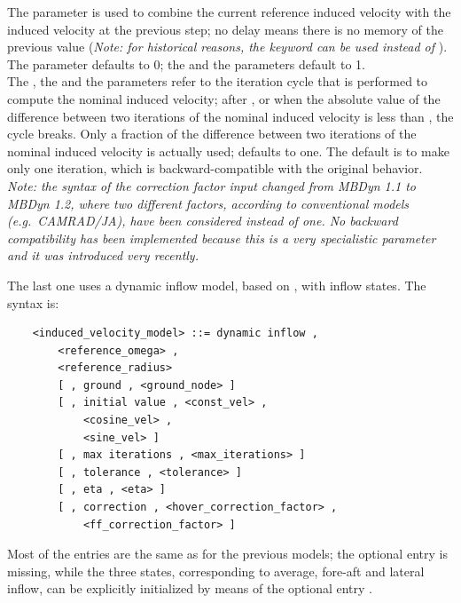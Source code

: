 The  parameter is used to
combine the current reference induced velocity with the induced velocity
at the previous step; no delay means there is no memory of the previous value 
(\emph{Note: for historical reasons, the keyword 
can be used instead of }). \\
The  parameter defaults to 0; 
the  
and the  parameters default to 1. \\
The , the  
and the  parameters refer to the iteration cycle 
that is performed to compute the nominal induced velocity; 
after , or when the absolute value 
of the difference between two iterations of the nominal induced 
velocity is less than , the cycle breaks.
Only a fraction  of the difference between two
iterations of the nominal induced velocity is actually
used;  defaults to one.
The default is to make only one iteration, which is backward-compatible
with the original behavior.
\emph{
	Note: the syntax of the correction factor input changed
	from MBDyn 1.1 to MBDyn 1.2, where two different factors,
	according to conventional models (e.g.\ CAMRAD/JA), have
	been considered instead of one.
	No backward compatibility has been implemented because 
	this is a very specialistic parameter and it was introduced 
	very recently.
}

\noindent
The last one uses a dynamic inflow model, based on \cite{PITT},
with inflow states.
The syntax is:
\begin{verbatim}
    <induced_velocity_model> ::= dynamic inflow , 
        <reference_omega> , 
        <reference_radius> 
        [ , ground , <ground_node> ]
        [ , initial value , <const_vel> ,
            <cosine_vel> ,
            <sine_vel> ]
        [ , max iterations , <max_iterations> ]
        [ , tolerance , <tolerance> ]
        [ , eta , <eta> ]
        [ , correction , <hover_correction_factor> ,
            <ff_correction_factor> ]
\end{verbatim}
Most of the entries are the same as for the previous models;
the  optional entry is missing, while the three states, 
corresponding to average, fore-aft and lateral inflow,
can be explicitly initialized by means of the optional 
entry .


